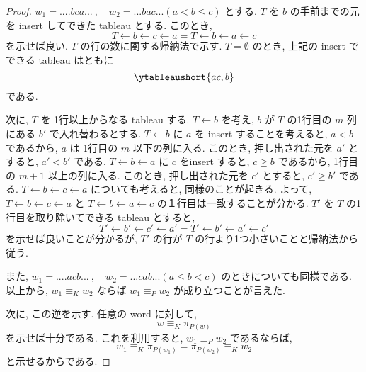\documentclass[
  a4paper, 
  12pt,
  ja=standard,
  xelatex,
  left=30truemm,
  right=30truemm,
  titlepage 
]{bxjsarticle}
\theoremstyle{definition}
\begin{document}
\begin{proof}
  $ w_1 = ....bca... \ , \quad w_2 = ...bac...(a < b \leq c) $ とする.
  $T$ を $b$ の手前までの元を insert してできた tableau とする.
  このとき,
  $$T \leftarrow b \leftarrow c \leftarrow a = T \leftarrow b \leftarrow a \leftarrow c$$
  を示せば良い.
  $T$ の行の数に関する帰納法で示す.
  $T = \emptyset$ のとき, 上記の insert でできる tableau はともに
  $$\ytableaushort{ac,b}$$
  である.

  次に, $T$ を 1行以上からなる tableau する.
  $T \leftarrow b$ を考え,
  $b$ が $T$ の1行目の $m$ 列にある $b'$ で入れ替わるとする.
  $T \leftarrow b$ に $a$ を insert することを考えると,
  $a < b$ であるから, $a$ は 1行目の $m$ 以下の列に入る.
  このとき, 押し出された元を $a'$ とすると, $a' < b'$ である.
  $T \leftarrow b \leftarrow a$ に $c$ をinsert すると,
  $c \geq b$ であるから, 1行目の $m + 1$ 以上の列に入る.
  このとき, 押し出された元を $c'$ とすると, $c' \geq b'$ である.
  $T \leftarrow b \leftarrow c \leftarrow a$ についても考えると,
  同様のことが起きる.
  よって, $T \leftarrow b \leftarrow c \leftarrow a$ と $T \leftarrow b \leftarrow a \leftarrow c$
  の１行目は一致することが分かる.
  $T'$ を $T$ の1行目を取り除いてできる tableau とすると,
  $$T' \leftarrow b' \leftarrow c' \leftarrow a' = T' \leftarrow b' \leftarrow a' \leftarrow c'$$
  を示せば良いことが分かるが, $T'$ の行が $T$ の行より1つ小さいことと帰納法から従う.

  また, $ w_1 = ....acb... \ , \quad w_2 = ...cab... (a \leq b < c)$ のときについても同様である.
  以上から, $w_1 \equiv_{K} w_2$ ならば $w_1 \equiv_{P} w_2$ が成り立つことが言えた.

  次に, この逆を示す. 任意の word に対して,
  $$w \equiv_{K} \pi_{P(w)}$$
  を示せば十分である. これを利用すると,
  $w_1 \equiv_{P} w_2 $ であるならば,
  $$w_1 \equiv_{K} \pi_{P(w_1)} = \pi_{P(w_2)} \equiv_{K}  w_2$$
  と示せるからである.


\end{proof}
\end{document}
